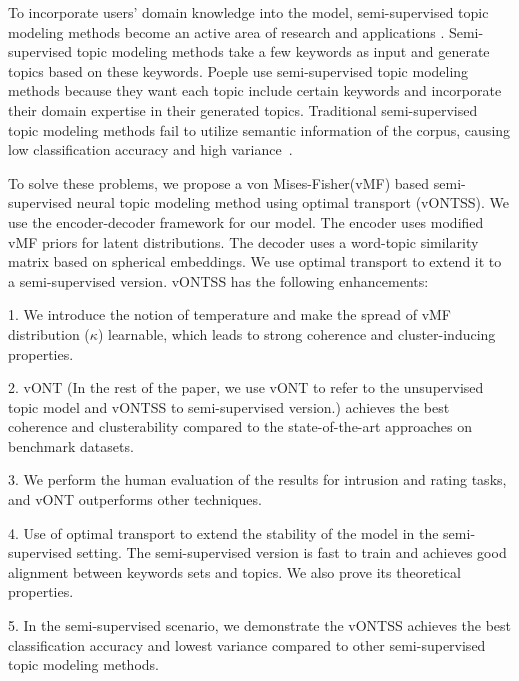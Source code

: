 \documentclass[11pt]{article}
\begin{document}
To incorporate users' domain knowledge into the model, semi-supervised topic modeling methods become an active area of research \cite{mao2012sshlda,jagarlamudi-etal-2012-incorporating, gallagher2018anchored} and applications \cite{choi2017application, cao2019qos,kim2013mining}. Semi-supervised topic modeling methods take a few keywords as input and generate topics based on these keywords. Poeple use semi-supervised topic modeling methods because they want each topic include certain keywords and incorporate their domain expertise in their generated topics.
Traditional semi-supervised topic modeling methods fail to utilize semantic information of the corpus, causing low classification accuracy and high variance~\cite{chiu2022joint}. 





To solve these problems, we propose a von Mises-Fisher(vMF) based semi-supervised neural topic modeling method using optimal transport (vONTSS). We use the encoder-decoder framework for our model. The encoder uses modified vMF priors for latent distributions. The decoder uses a word-topic similarity matrix based on spherical embeddings. We use optimal transport to extend it to a semi-supervised version. vONTSS has the following enhancements:


1. We introduce the notion of temperature and make the spread of vMF distribution ($\kappa$) learnable, which leads to strong coherence and cluster-inducing properties.



2. vONT (In the rest of the paper, we use vONT to refer to the unsupervised topic model and vONTSS to semi-supervised version.) achieves the best coherence and clusterability compared to the state-of-the-art approaches on benchmark datasets.

3. We perform the human evaluation of the results for intrusion and rating tasks, and vONT outperforms other techniques.


4. Use of optimal transport to extend the stability of the model in the semi-supervised setting. The semi-supervised version is fast to train and achieves good alignment between keywords sets and topics. We also prove its theoretical properties.










5. In the semi-supervised scenario, we demonstrate the vONTSS achieves the best classification accuracy and lowest variance compared to other semi-supervised topic modeling methods.
\end{document}
